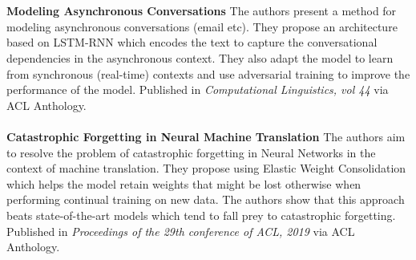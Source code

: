 \documentclass[a4]{article}
\begin{document}
\\
\\
\textbf{Modeling Asynchronous Conversations} \cite{modelingAsync} The authors present a method for modeling asynchronous conversations (email etc). They propose an architecture based on LSTM-RNN which encodes the text to capture the conversational dependencies in the asynchronous context. They also adapt the model to learn from synchronous (real-time) contexts and use adversarial training to improve the performance of the model. Published in \textit{Computational Linguistics, vol 44} via ACL Anthology.
\\
\\
\textbf{Catastrophic Forgetting in Neural Machine Translation} \cite{catasFor} The authors aim to resolve the problem of catastrophic forgetting in Neural Networks in the context of machine translation. They propose using Elastic Weight Consolidation which helps the model retain weights that might be lost otherwise when performing continual training on new data. The authors show that this approach beats state-of-the-art models which tend to fall prey to catastrophic forgetting. Published in \textit{Proceedings of the 29th conference of ACL, 2019} via ACL Anthology.
\end{document}
